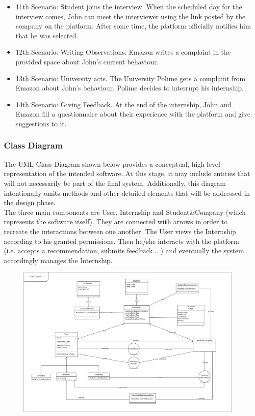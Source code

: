 \documentclass{article}
\begin{document}
\begin{itemize}
        \item 11th Scenario: Student joins the interview. When the scheduled day for the interview comes, John can meet the interviewer using the link posted by the company on the platform. After some time, the platform officially notifies him that he was selected.
        \item 12th Scenario: Writing Observations. Emazon writes a complaint in the provided space about John's current behaviour.
        \item 13th Scenario: University acts. The University Polime gets a complaint from Emazon about John's behaviour. Polime decides to interrupt his internship.
        \item 14th Scenario: Giving Feedback. At the end of the internship, John and Emazon fill a questionnaire about their experience with the platform and give suggestions to it.
    \end{itemize}
\subsubsection{Class Diagram}
The UML Class Diagram shown below provides a conceptual, high-level representation of the intended software. At this stage, it may include entities that will not necessarily be part of the final system. Additionally, this diagram intentionally omits methods and other detailed elements that will be addressed in the design phase.
\\The three main components are User, Internship and Student\&Company (which represents the software itself). They are connected with arrows in order to recreate the interactions between one another. The User views the Internship according to his granted permissions. Then he/she interacts with the platform (i.e. accepts a recommendation, submits feedback... ) and eventually the system accordingly manages the Internship.
\begin{figure}[H]
    \centering
    \includegraphics[scale = 0.30]{figures/Class Diagram.drawio.png}
    \centering
\end{figure}
\end{document}

